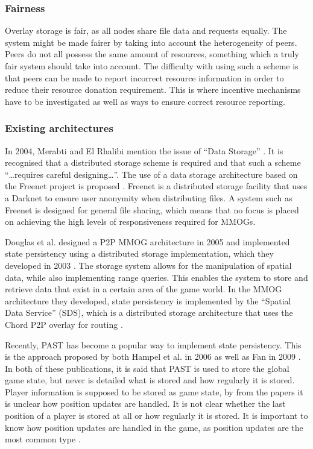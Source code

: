 \documentclass[10pt,a4paper,journal,cspaper,compsoc]{IEEEtran}
\begin{document}
\subsubsection{Fairness}

Overlay storage is fair, as all nodes share file data and requests equally. The system might be made fairer by taking into account the heterogeneity
of peers. Peers do not all possess the same amount of resources, something which a truly fair system should take into account. The difficulty with
using such a scheme is that peers can be made to report incorrect resource information in order to reduce their resource donation requirement. This
is where incentive mechanisms have to be investigated as well as ways to ensure correct resource reporting.

\subsubsection{Existing architectures}

In 2004, Merabti and El Rhalibi mention the issue of ``Data Storage'' \cite{using_freenet_storage}. It is recognised that a distributed storage
scheme is required and that such a scheme ``\ldots requires careful designing\ldots''. The use of a data storage architecture based on the Freenet
project is proposed \cite{clarke_freenet}. Freenet is a distributed storage facility that uses a Darknet to ensure user anonymity when distributing
files. A system such as Freenet is designed for general file sharing, which means that no focus is placed on achieving the high levels of
responsiveness required for MMOGs.

Douglas et al. designed a P2P MMOG architecture in 2005 \cite{Douglas05enablingmassively} and implemented state persistency using a distributed
storage implementation, which they developed in 2003 \cite{Harwood03hashingspatial}. The storage system allows for the manipulation of spatial data,
while also implementing range queries. This enables the system to store and retrieve data that exist in a certain area of the game world. In the MMOG
architecture they developed, state persistency is implemented by the ``Spatial Data Service'' (SDS), which is a distributed storage architecture that
uses the Chord P2P overlay for routing \cite{chord}.

Recently, PAST has become a popular way to implement state persistency. This is the approach proposed by both Hampel et al. in 2006
\cite{past_storage_focus} as well as Fan in 2009 \cite{Fan_phd}. In both of these publications, it is said that PAST is used to store the global game
state, but never is detailed what is stored and how regularly it is stored. Player information is supposed to be stored as game state, by from the
papers it is unclear how position updates are handled. It is not clear whether the last position of a player is stored at all or how regularly it is
stored. It is important to know how position updates are handled in the game, as position updates are the most common type \cite{knutsson_p2p_first}.
\end{document}
